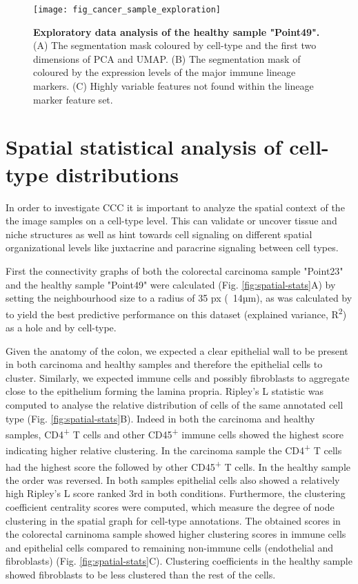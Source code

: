 \begin{figure}[p]
    \centering
    \texttt{[image: fig\_cancer\_sample\_exploration]}
    \caption{\textbf{Exploratory data analysis of the healthy sample "Point49".} (A) The segmentation mask coloured by cell-type and the first two dimensions of PCA and UMAP. (B) The segmentation mask of coloured by the expression levels of the major immune lineage markers. (C) Highly variable features not found within the lineage marker feature set.}
    \label{fig:explor-healthy}
\end{figure}

\pagebreak


\section{Spatial statistical analysis of cell-type distributions}

In order to investigate CCC it is important to analyze the spatial context of the the image samples on a cell-type level. This can validate or uncover tissue and niche structures as well as hint towards cell signaling on different spatial organizational levels like juxtacrine and paracrine signaling between cell types.

First the connectivity graphs of both the colorectal carcinoma sample "Point23" and the healthy sample "Point49" were calculated (Fig. \ref{fig:spatial-stats}A) by setting the neighbourhood size to a radius of 35 px (~14µm), as was calculated by \cite{Fischer-2022} to yield the best predictive performance on this dataset (explained variance, R\textsuperscript{2}) as a hole and by cell-type.

Given the anatomy of the colon, we expected a clear epithelial wall to be present in both carcinoma and healthy samples and therefore the epithelial cells to cluster. Similarly, we expected immune cells and possibly fibroblasts to aggregate close to the epithelium forming the lamina propria. Ripley's L statistic was computed to analyse the relative distribution of cells of the same annotated cell type (Fig. \ref{fig:spatial-stats}B). Indeed in both the carcinoma and healthy samples, CD4\textsuperscript{+} T cells and other CD45\textsuperscript{+} immune cells showed the highest score indicating higher relative clustering. In the carcinoma sample the CD4\textsuperscript{+} T cells had the highest score the followed by other CD45\textsuperscript{+} T cells. In the healthy sample the order was reversed. In both samples epithelial cells also showed a relatively high Ripley's L score ranked 3rd in both conditions. Furthermore, the clustering coefficient centrality scores were computed, which measure the degree of node clustering in the spatial graph for cell-type annotations. The obtained scores in the colorectal carninoma sample showed higher clustering scores in immune cells and epithelial cells compared to remaining non-immune cells (endothelial and fibroblasts) (Fig. \ref{fig:spatial-stats}C). Clustering coefficients in the healthy sample showed fibroblasts to be less clustered than the rest of the cells.


